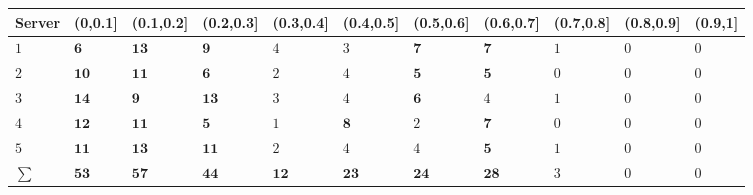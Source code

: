 
\begin{tabular}{l|l|l|l|l|l|l|l|l|l|l}
\hline
Server & (0,0.1] & (0.1,0.2] & (0.2,0.3] & (0.3,0.4] & (0.4,0.5] & (0.5,0.6] & (0.6,0.7] & (0.7,0.8] & (0.8,0.9] & (0.9,1]\\
\hline
$1$ & $\bm{6}$ & $\bm{13}$ & $\bm{9}$ & $4$ & $3$ & $\bm{7}$ & $\bm{7}$ & $1$ & $0$ & $0$\\
\hline
$2$ & $\bm{10}$ & $\bm{11}$ & $\bm{6}$ & $2$ & $4$ & $\bm{5}$ & $\bm{5}$ & $0$ & $0$ & $0$\\
\hline
$3$ & $\bm{14}$ & $\bm{9}$ & $\bm{13}$ & $3$ & $4$ & $\bm{6}$ & $4$ & $1$ & $0$ & $0$\\
\hline
$4$ & $\bm{12}$ & $\bm{11}$ & $\bm{5}$ & $1$ & $\bm{8}$ & $2$ & $\bm{7}$ & $0$ & $0$ & $0$\\
\hline
$5$ & $\bm{11}$ & $\bm{13}$ & $\bm{11}$ & $2$ & $4$ & $4$ & $\bm{5}$ & $1$ & $0$ & $0$\\
\hline
$\sum$ & $\bm{53}$ & $\bm{57}$ & $\bm{44}$ & $\bm{12}$ & $\bm{23}$ & $\bm{24}$ & $\bm{28}$ & $3$ & $0$ & $0$\\
\hline
\end{tabular}
